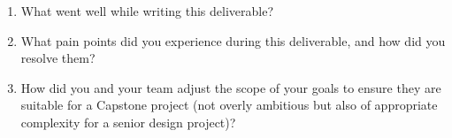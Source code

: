 \documentclass{article}
\begin{document}



\begin{enumerate}
    \item What went well while writing this deliverable? 
    \item What pain points did you experience during this deliverable, and how
    did you resolve them?
    \item How did you and your team adjust the scope of your goals to ensure
    they are suitable for a Capstone project (not overly ambitious but also of
    appropriate complexity for a senior design project)?
\end{enumerate}  
\end{document}
